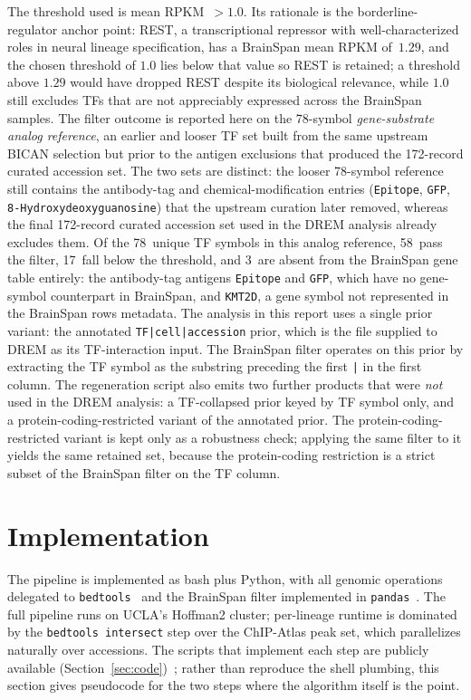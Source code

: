 \documentclass[sigconf,nonacm]{acmart}
\begin{document}
The threshold used is mean RPKM~$> 1.0$. Its rationale is the
borderline-regulator anchor point: REST, a transcriptional repressor
with well-characterized roles in neural lineage specification, has a
BrainSpan mean RPKM of~$1.29$, and the chosen threshold of $1.0$
lies below that value so REST is retained; a threshold above $1.29$
would have dropped REST despite its biological relevance, while
$1.0$ still excludes TFs that are not appreciably expressed across
the BrainSpan samples. The filter outcome is reported here on the
78-symbol \emph{gene-substrate analog reference}, an earlier and
looser TF set built from the same upstream BICAN selection but prior
to the antigen exclusions that produced the 172-record curated
accession set. The two sets are distinct: the looser 78-symbol
reference still contains the antibody-tag and chemical-modification
entries (\texttt{Epitope}, \texttt{GFP},
\texttt{8-Hydroxydeoxyguanosine}) that the upstream curation later
removed, whereas the final 172-record curated accession set used in
the DREM analysis already excludes them. Of the 78~unique TF symbols
in this analog reference, 58~pass the filter, 17~fall below the
threshold, and 3~are absent from the BrainSpan gene table entirely:
the antibody-tag antigens \texttt{Epitope} and \texttt{GFP}, which
have no gene-symbol counterpart in BrainSpan, and \texttt{KMT2D}, a
gene symbol not represented in the BrainSpan rows metadata. The analysis in this
report
uses a single prior variant: the annotated
\texttt{TF|cell|accession} prior, which is the file supplied to DREM
as its TF-interaction input. The BrainSpan filter operates on this
prior by extracting the TF symbol as the substring preceding the
first \texttt{|} in the first column. The regeneration script also
emits two further products that were \emph{not} used in the DREM
analysis: a TF-collapsed prior keyed by TF symbol only, and a
protein-coding-restricted variant of the annotated prior. The
protein-coding-restricted variant is kept only as a robustness
check; applying the same filter to it yields the same retained set,
because the protein-coding restriction is a strict subset of the
BrainSpan filter on the TF column.

\section{Implementation}
\label{sec:impl}

The pipeline is implemented as bash plus Python, with all genomic
operations delegated to \texttt{bedtools}~\cite{quinlan2010bedtools}
and the BrainSpan filter implemented in
\texttt{pandas}~\cite{mckinney2010pandas}. The full pipeline runs on
UCLA's Hoffman2 cluster; per-lineage runtime is dominated by the
\texttt{bedtools intersect} step over the ChIP-Atlas peak set, which
parallelizes naturally over accessions. The scripts that implement
each step are publicly available
(Section~\ref{sec:code})~\cite{paino2026repo}; rather than reproduce
the shell plumbing, this section gives pseudocode for the two steps
where the algorithm itself is the point.
\end{document}

